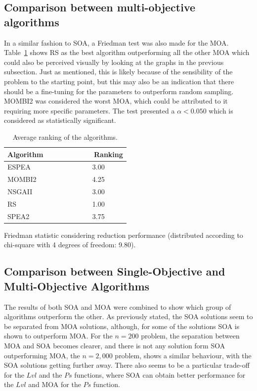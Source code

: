 \subsection{Comparison between multi-objective algorithms}

In a similar fashion to SOA, a Friedman test was also made for the MOA. Table~\ref{table:fried_igdp_(MOA)} shows RS as the best algorithm outperforming all the other MOA which could also be perceived visually by looking at the graphs in the previous subsection. Just as mentioned, this is likely because of the sensibility of the problem to the starting point, but this may also be an indication that there should be a fine-tuning for the parameters to outperform random sampling. MOMBI2 was considered the worst MOA, which could be attributed to it requiring more specific parameters. The test presented a $\alpha < 0.050$ which is considered as statistically significant.


\begin{table}[!htp]
    \centering
    \begin{threeparttable}
    \begin{tabular}{lc}
    \hline
    Algorithm~~~~~~&~~~~~Ranking\\
    \hline
    ESPEA&3.00\\
    MOMBI2&4.25\\
    NSGAII&3.00\\
    RS&1.00\\
    SPEA2&3.75\\
    \hline
    \end{tabular}
        \begin{tablenotes}
        \small
        \item Friedman statistic considering reduction performance (distributed according to chi-square with 4 degrees of freedom: 9.80).
        \end{tablenotes}
    \end{threeparttable}
    \caption{Average ranking of the algorithms.}
    \label{table:fried_igdp_(MOA)}
\end{table}

\subsection{Comparison between Single-Objective and Multi-Objective Algorithms}

The results of both SOA and MOA were combined to show which group of algorithms outperform the other. As previously stated, the SOA solutions seem to be separated from MOA solutions, although, for some of the solutions SOA is shown to outperform MOA. For the $n=200$ problem, the separation between MOA and SOA becomes clearer, and there is not any solution form SOA outperforming MOA, the $n=2,000$ problem, shows a similar behaviour, with the SOA solutions getting further away. There also seems to be a particular trade-off for the $Lvl$ and the $Ps$ functions, where SOA can obtain better performance for the $Lvl$ and MOA for the $Ps$ function.\\

